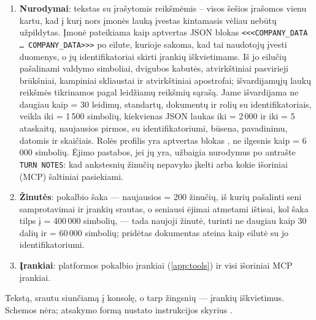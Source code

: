 \begin{enumerate}[itemsep=1pt, topsep=3pt]
  \item \textbf{Nurodymai}: tekstas su įrašytomis reikšmėmis -- visos šešios įrašomos vienu
    kartu, kad į kurį nors įmonės lauką įvestas kintamasis vėliau nebūtų užpildytas. Įmonė
    pateikiama kaip aptvertas JSON blokas \texttt{<<<COMPANY\_DATA … COMPANY\_DATA>>>} po eilute,
    kurioje sakoma, kad tai naudotojų įvesti duomenys, o jų identifikatoriai skirti įrankių
    iškvietimams. Iš jo eilučių pašalinami valdymo simboliai, dvigubos kabutės, atvirkštiniai
    pasvirieji brūkšniai, kampiniai skliaustai ir atvirkštiniai apostrofai; išvardijamųjų laukų
    reikšmės tikrinamos pagal leidžiamų reikšmių sąrašą. Jame išvardijama ne daugiau kaip
     = 30 leidimų, standartų, dokumentų ir rolių su identifikatoriais, veikla
    iki  = 1\,500 simbolių, kiekvienas JSON laukas iki
     = 2\,000 ir iki  = 5 ataskaitų, naujausios
    pirmos, su identifikatoriumi, būsena, pavadinimu, datomis ir skaičiais. Rolės profilis yra
    aptvertas blokas , ne ilgesnis kaip  = 6\,000
    simbolių. Ėjimo pastabos, jei jų yra, užbaigia nurodymus po antrašte \texttt{TURN NOTES}:
    kad ankstesnių žinučių nepavyko įkelti arba kokie išoriniai (MCP) šaltiniai pasiekiami.
  \item \textbf{Žinutės}: pokalbio šaka --- naujausios  = 200
    žinučių, iš kurių pašalinti seni samprotavimai ir įrankių srautas, o seniausi ėjimai
    atmetami ištisai, kol šaka tilps į  = 400\,000 simbolių, --- tada
    naujoji žinutė, turinti ne daugiau kaip 30 dalių ir  = 60\,000
    simbolių; pridėtas dokumentas ateina kaip eilutė su jo identifikatoriumi.
  \item \textbf{Įrankiai}: platformos pokalbio įrankiai (\cref{app:tools}) ir visi išoriniai MCP
    įrankiai.
\end{enumerate}

 Tekstą, srautu siunčiamą į konsolę, o tarp žingsnių ---
įrankių iškvietimus. Schemos nėra; atsakymo formą nustato instrukcijos skyrius .


